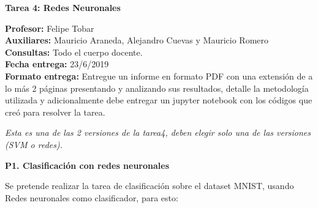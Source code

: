 \documentclass[11pt,letterpaper]{article}
\begin{document}
\pagestyle{fancy}
\fancyhf{}

\begin{center}
\large {\textbf{Tarea 4: Redes Neuronales}}\\
\end{center}
\textbf{Profesor:} Felipe Tobar\\ 
\textbf{Auxiliares:} Mauricio Araneda, Alejandro Cuevas y Mauricio Romero \\
\textbf{Consultas:} Todo el cuerpo docente.\\
\textbf{Fecha entrega:} 23/6/2019 \\
\textbf{Formato entrega:} Entregue un informe en formato PDF con una extensión de a lo más 2 páginas presentando y analizando sus resultados, detalle la metodología utilizada y adicionalmente debe entregar un jupyter notebook con los códigos que creó para resolver la tarea.

\begin{center}
    \textit{Esta es una de las 2 versiones de la tarea4, deben elegir solo una de las versiones (SVM o redes).}
\end{center}

\noindent\textbf{P1. Clasificación con redes neuronales}
\vspace{5 mm}

Se pretende realizar la tarea de clasificación sobre el dataset MNIST, usando Redes neuronales como clasificador, para esto:
    
\end{document}

